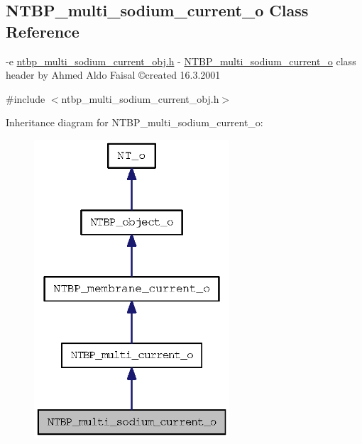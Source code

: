 \subsection{NTBP\_\-multi\_\-sodium\_\-current\_\-o Class Reference}
\label{class_n_t_b_p__multi__sodium__current__o}


-\/e \hyperlink{ntbp__multi__sodium__current__obj_8h}{ntbp\_\-multi\_\-sodium\_\-current\_\-obj.h} -\/ \hyperlink{class_n_t_b_p__multi__sodium__current__o}{NTBP\_\-multi\_\-sodium\_\-current\_\-o} class header by Ahmed Aldo Faisal \copyright created 16.3.2001  




{\ttfamily \#include $<$ntbp\_\-multi\_\-sodium\_\-current\_\-obj.h$>$}



Inheritance diagram for NTBP\_\-multi\_\-sodium\_\-current\_\-o:
\nopagebreak
\begin{figure}[H]
\begin{center}
\leavevmode
\includegraphics[width=206pt]{class_n_t_b_p__multi__sodium__current__o__inherit__graph}
\end{center}
\end{figure}


